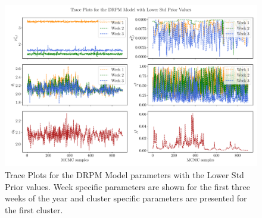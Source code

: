 \documentclass[12pt,a4paper]{article}
\begin{document}
\begin{figure}
    \centering
    \includegraphics[width=.99\linewidth]{./imgs/drpm_lower_std_trace_plots.pdf}
    \caption{Trace Plots for the DRPM Model parameters with the Lower Std Prior values. Week specific
    parameters are shown for the first three weeks of the year and cluster specific parameters are
    presented for the first cluster.}
    \label{fig:drpm_lower_std_trace_plots}
\end{figure}
\end{document}
